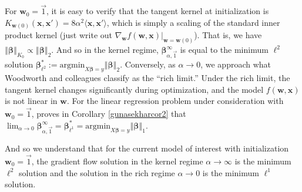 \documentclass{article}
\begin{document}
For $\boldsymbol{w}_0 = \vec{1}$, it is easy to verify that the tangent kernel at initialization is $K_{\boldsymbol{w}(0)}(\boldsymbol{x}, \boldsymbol{x}') = 8 \alpha^2 \langle \boldsymbol{x}, \boldsymbol{x}' \rangle$, which is simply a scaling of the standard inner product kernel (just write out $\nabla_{\boldsymbol{w}} f(\boldsymbol{w}, \boldsymbol{x}) |_{\boldsymbol{w} = \boldsymbol{w}(0)}$).
That is, we have $\left\Vert \boldsymbol{\beta} \right\Vert_{K_0} \propto \left\Vert \boldsymbol{\beta} \right\Vert_2$. And so in the kernel regime, $\boldsymbol{\beta}_{\alpha, \vec{1}}^{\infty}$ is equal to the minimum $\ell^2$ solution $\boldsymbol{\beta}_{\ell^2}^* := \text{argmin}_{X \boldsymbol{\beta} = y} \left\Vert \boldsymbol{\beta} \right\Vert_2$. Conversely, as $\alpha \rightarrow 0$, we approach what Woodworth and colleagues classify as the \enquote{rich limit.} Under the rich limit, the tangent kernel changes significantly during optimization, and the model $f(\boldsymbol{w}, \boldsymbol{x})$ is not linear in $\boldsymbol{w}$. For the linear regression problem under consideration with $\boldsymbol{w}_0 = \vec{1}$, \cite{gunasekar2018implicit} proves in Corollary \ref{gunasekharcor2} that $\lim_{\alpha \rightarrow 0} \boldsymbol{\beta}_{\alpha, \vec{1}}^{\infty} = \boldsymbol{\beta}_{\ell^1}^* = \text{argmin}_{X \boldsymbol{\beta} = y} \left\Vert \boldsymbol{\beta}\right\Vert_1$.

And so we understand that for the current model of interest with initialization $\boldsymbol{w}_0 = \vec{1}$, the gradient flow solution in the kernel regime $\alpha \rightarrow \infty$ is the minimum $\ell^2$ solution and the solution in the rich regime $\alpha \rightarrow 0$ is the minimum $\ell^1$ solution. 
\end{document}
